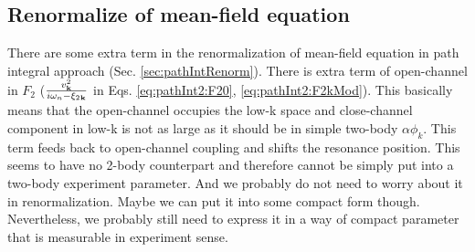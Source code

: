 \subsection{Renormalize of mean-field equation}
There are some extra term in the renormalization of mean-field equation in path integral approach (Sec. \ref{sec:pathIntRenorm}).  There is extra term of open-channel in $F_{2}$ ($\frac{v_{\mathbf{k}}^{2}}{i\omega_{n}-\xi_{2}{}_{\mathbf{k}}}$ in Eqs. \ref{eq:pathInt2:F20}, \ref{eq:pathInt2:F2kMod}).  This basically means that the open-channel occupies the low-k space and close-channel component in low-k is not as large as it should be in simple two-body $\alpha\phi_{k}$.  This term feeds back to open-channel coupling and shifts the resonance position.  This seems to have no 2-body counterpart and therefore cannot be simply put into a two-body experiment parameter.  And we probably do not need to worry about it in renormalization.  Maybe we can put it into some compact form though.  Nevertheless, we probably still need to express it in a way of compact parameter that is measurable in experiment sense.  

